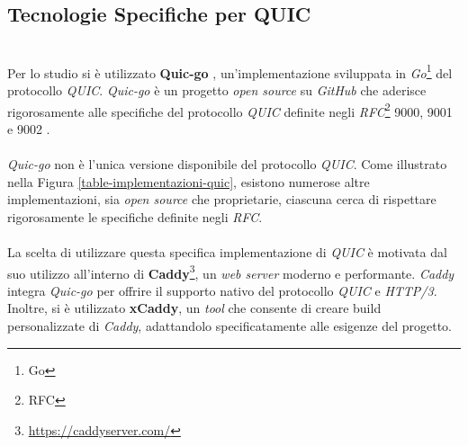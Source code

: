 \subsection{Tecnologie Specifiche per QUIC}
~\\
\indent Per lo studio si è utilizzato \textbf{Quic-go} \cite{site:quic-go}, un'implementazione sviluppata in \emph{Go}\footnote{\gls{Go}} del protocollo \emph{QUIC}.
\emph{Quic-go} è un progetto \emph{open source} su \emph{GitHub} che aderisce rigorosamente alle specifiche del protocollo \emph{QUIC} 
definite negli \emph{RFC}\footnote{\gls{RFC}} 9000, 9001 e 9002 \cite{site:rfc9000,site:rfc9001,site:rfc9002}. 
\\\\
\emph{Quic-go} non è l'unica versione disponibile del protocollo \emph{QUIC}.
Come illustrato nella Figura \ref{table-implementazioni-quic}, esistono numerose altre implementazioni, sia \emph{open source} che proprietarie, ciascuna cerca di rispettare rigorosamente le specifiche definite negli \emph{RFC}. 
\\\\
La scelta di utilizzare questa specifica implementazione di \emph{QUIC} è motivata dal suo utilizzo all'interno di \textbf{Caddy}\footnote{\url{https://caddyserver.com/}}, un \emph{web server} moderno e performante. \emph{Caddy} integra \emph{Quic-go} per offrire il supporto nativo del protocollo \emph{QUIC} e \emph{HTTP/3}.
Inoltre, si è utilizzato \textbf{xCaddy}, un \emph{tool} che consente di creare build personalizzate di \emph{Caddy}, adattandolo specificatamente alle esigenze del progetto.

